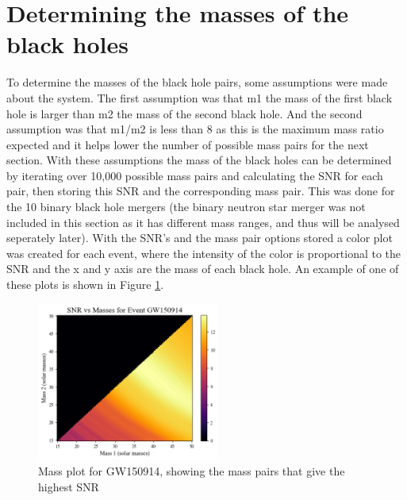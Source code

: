 \documentclass[]{article}
\begin{document}
\section*{Determining the masses of the black holes}
To determine the masses of the black hole pairs, some assumptions were made
about the system. The first assumption was that m1 the mass of the first black hole is larger
than m2 the mass of the second black hole. And the second assumption was that m1/m2 is less than 8
as this is the maximum mass ratio expected and it helps lower the number of possible mass pairs
for the next section. With these assumptions the mass of the black holes can be determined by
iterating over 10,000 possible mass pairs and calculating the SNR for each pair, then storing this
SNR and the corresponding mass pair. This was done for the 10 binary black hole mergers (the binary neutron star
merger was not included in this section as it has different mass ranges, and thus will be analysed seperately
later). With the SNR's and the mass pair options stored a color plot was created for each event, where
the intensity of the color is proportional to the SNR and the x and y axis are the mass of each black hole.
An example of one of these plots is shown in Figure \ref{fig:mass_plot}.
\begin{figure}[h]
    \includegraphics[width=6cm]{images/snr_color.png}
    \caption{Mass plot for GW150914, showing the mass pairs that give the highest SNR}
    \label{fig:mass_plot}
\end{figure}
\newline
\end{document}
